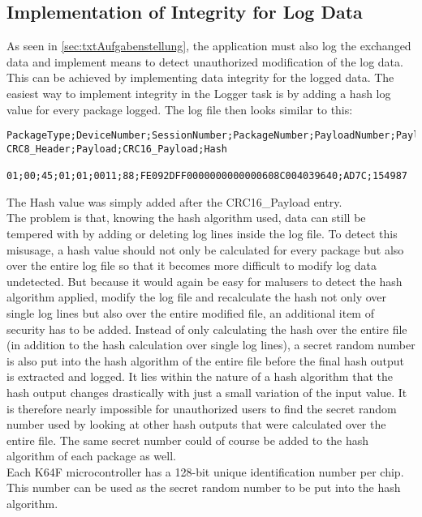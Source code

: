 \subsection{Implementation of Integrity for Log Data}
As seen in \autoref{sec:txtAufgabenstellung}, the application must also log the exchanged data and implement means to detect unauthorized modification of the log data. This can be achieved by implementing data integrity for the logged data.
The easiest way to implement integrity in the Logger task is by adding a hash log value for every package logged. The log file then looks similar to this:\\
\begin{lstlisting}
PackageType;DeviceNumber;SessionNumber;PackageNumber;PayloadNumber;PayloadSize;
CRC8_Header;Payload;CRC16_Payload;Hash

01;00;45;01;01;0011;88;FE092DFF0000000000000608C004039640;AD7C;154987
\end{lstlisting}
The Hash value was simply added after the CRC16\_Payload entry.\\
The problem is that, knowing the hash algorithm used, data can still be tempered with by adding or deleting log lines inside the log file. To detect this misusage, a hash value should not only be calculated for every package but also over the entire log file so that it becomes more difficult to modify log data undetected. But because it would again be easy for malusers to detect the hash algorithm applied, modify the log file and recalculate the hash not only over single log lines but also over the entire modified file, an additional item of security has to be added. Instead of only calculating the hash over the entire file (in addition to the hash calculation over single log lines), a secret random number is also put into the hash algorithm of the entire file before the final hash output is extracted and logged. It lies within the nature of a hash algorithm that the hash output changes drastically with just a small variation of the input value. It is therefore nearly impossible for unauthorized users to find the secret random number used by looking at other hash outputs that were calculated over the entire file. The same secret number could of course be added to the hash algorithm of each package as well.\\
Each K64F microcontroller has a 128-bit unique identification number per chip. This number can be used as the secret random number to be put into the hash algorithm.\\
